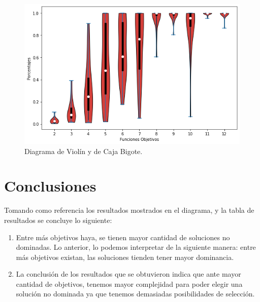 \documentclass{article}
\begin{document}
	

	    
	    	\begin{figure}[h!]
	    	\centering
	    	\includegraphics[width=0.7\linewidth]{fobjetivos.png}
	    	\caption{Diagrama de Violín y de Caja Bigote.}
	    	\label{fig:imagen3}
	    		\newpage
	    	
	    	\end{figure}
    	
 
    \section{Conclusiones}
    Tomando como referencia los resultados mostrados en el diagrama, y la tabla de resultados se concluye lo siguiente:
    \begin{enumerate}			
    	\item	Entre más objetivos haya, se tienen mayor cantidad de soluciones no dominadas. Lo anterior, lo podemos interpretar de la siguiente manera: entre más objetivos existan, las soluciones tienden tener mayor dominancia. 
    	\item	La conclusión de los resultados que se obtuvieron indica que ante mayor cantidad de objetivos, tenemos mayor complejidad para poder elegir una solución no dominada  ya que tenemos demasiadas posibilidades de selección.  
    	
    \end{enumerate}




    
\end{document}

